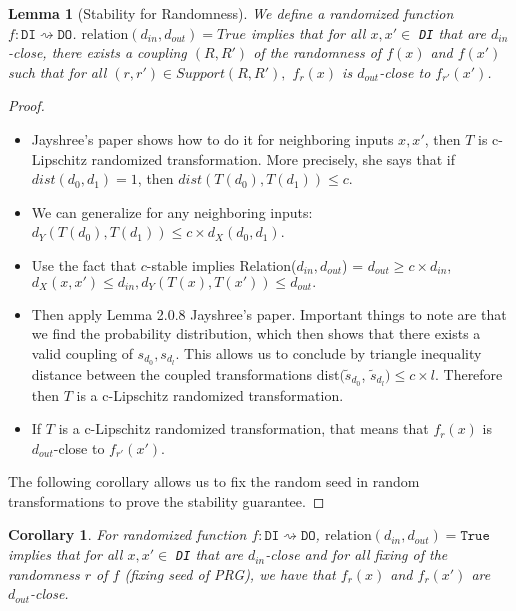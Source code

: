 \documentclass[11pt,a4paper]{article}
\newtheorem{corollary}[theorem]{Corollary}
\newtheorem{lemma}[theorem]{Lemma}
\theoremstyle{definition}
\newcommand{\din}{d_{in}}
\newcommand{\dout}{d_{out}}
\newcommand{\Relation}{\mathrm{relation}}
\newcommand{\grace}[1]{{ {\color{purple}{(grace)~#1}}}}
\begin{document}
\begin{lemma}[Stability for Randomness]
We define a randomized function $f: \texttt{DI} \rightsquigarrow \texttt{DO}$. $\Relation(d_{in}, d_{out}) = True$ implies that for all $x, x' \in$ \texttt{DI} that are $d_{in}$-close, there exists a coupling $(R, R')$ of the randomness of $f(x)$ and $f(x')$ such that for all $(r, r') \in Support(R, R'),$ $f_r(x)$ is $d_{out}$-close to $f_{r'}(x')$.
\end{lemma}

\begin{proof}
\grace{Proof outline:}
\begin{itemize}
    \item Jayshree's paper shows how to do it for neighboring inputs $x, x'$, then $T$ is c-Lipschitz randomized transformation. More precisely, she says that if $dist(d_0, d_1) = 1$, then $dist(T(d_0), T(d_1)) \leq c$.
    \item We can generalize for any neighboring inputs: $d_Y(T(d_0), T(d_1)) \leq c \times d_X(d_0, d_1)$. 
    \item Use the fact that $c$-stable implies Relation($\din, \dout$) = $\dout \geq c \times \din$, $d_X(x, x') \leq \din, d_Y(T(x), T(x')) \leq \dout.$
    \item Then apply Lemma 2.0.8 Jayshree's paper. Important things to note are that we find the probability distribution, which then shows that there exists a valid coupling of $s_{d_0}, s_{d_l}$. This allows us to conclude by triangle inequality distance between the coupled transformations dist$(\tilde{s}_{d_0}$, $\tilde{s}_{d_l}) \leq c \times l$. Therefore then $T$ is a c-Lipschitz randomized transformation.
    \item If $T$ is a c-Lipschitz randomized transformation, that means that $f_r(x)$ is $\dout$-close to $f_{r'}(x')$. \grace{Need to flesh out these details.}
\end{itemize}

The following corollary allows us to fix the random seed in random transformations to prove the stability guarantee.
\end{proof}

\begin{corollary}
For randomized function $f: \texttt{DI} \rightsquigarrow \texttt{DO}$, $\Relation(d_{in}, d_{out}) = \texttt{True}$ implies that for all $x, x' \in$ \texttt{DI} that are $d_{in}$-close and for all fixing of the randomness $r$ of $f$ (fixing seed of PRG), we have that $f_r(x)$ and $f_r(x')$ are $d_{out}$-close.
\end{corollary}
\end{document}
